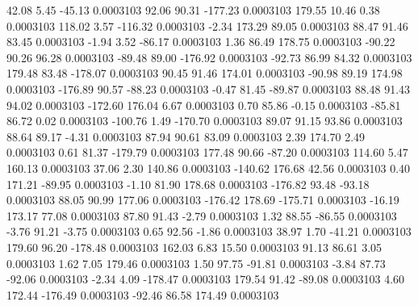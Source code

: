        42.08        5.45      -45.13     0.0003103
       92.06       90.31     -177.23     0.0003103
      179.55       10.46        0.38     0.0003103
      118.02        3.57     -116.32     0.0003103
       -2.34      173.29       89.05     0.0003103
       88.47       91.46       83.45     0.0003103
       -1.94        3.52      -86.17     0.0003103
        1.36       86.49      178.75     0.0003103
      -90.22       90.26       96.28     0.0003103
      -89.48       89.00     -176.92     0.0003103
      -92.73       86.99       84.32     0.0003103
      179.48       83.48     -178.07     0.0003103
       90.45       91.46      174.01     0.0003103
      -90.98       89.19      174.98     0.0003103
     -176.89       90.57      -88.23     0.0003103
       -0.47       81.45      -89.87     0.0003103
       88.48       91.43       94.02     0.0003103
     -172.60      176.04        6.67     0.0003103
        0.70       85.86       -0.15     0.0003103
      -85.81       86.72        0.02     0.0003103
     -100.76        1.49     -170.70     0.0003103
       89.07       91.15       93.86     0.0003103
       88.64       89.17       -4.31     0.0003103
       87.94       90.61       83.09     0.0003103
        2.39      174.70        2.49     0.0003103
        0.61       81.37     -179.79     0.0003103
      177.48       90.66      -87.20     0.0003103
      114.60        5.47      160.13     0.0003103
       37.06        2.30      140.86     0.0003103
     -140.62      176.68       42.56     0.0003103
        0.40      171.21      -89.95     0.0003103
       -1.10       81.90      178.68     0.0003103
     -176.82       93.48      -93.18     0.0003103
       88.05       90.99      177.06     0.0003103
     -176.42      178.69     -175.71     0.0003103
      -16.19      173.17       77.08     0.0003103
       87.80       91.43       -2.79     0.0003103
        1.32       88.55      -86.55     0.0003103
       -3.76       91.21       -3.75     0.0003103
        0.65       92.56       -1.86     0.0003103
       38.97        1.70      -41.21     0.0003103
      179.60       96.20     -178.48     0.0003103
      162.03        6.83       15.50     0.0003103
       91.13       86.61        3.05     0.0003103
        1.62        7.05      179.46     0.0003103
        1.50       97.75      -91.81     0.0003103
       -3.84       87.73      -92.06     0.0003103
       -2.34        4.09     -178.47     0.0003103
      179.54       91.42      -89.08     0.0003103
        4.60      172.44     -176.49     0.0003103
      -92.46       86.58      174.49     0.0003103
